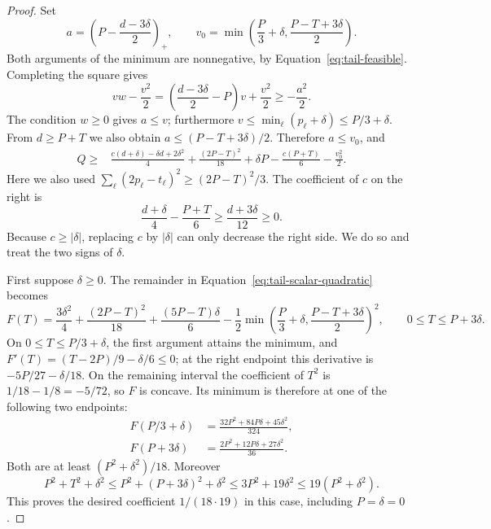\begin{proof}
Set
\[
 a=\left(P-\frac{d-3\delta}{2}\right)_+,
 \qquad v_0=\min\left(\frac P3+\delta,
                         \frac{P-T+3\delta}{2}\right).
\]
Both arguments of the minimum are nonnegative, by
Equation~\eqref{eq:tail-feasible}.  Completing the square gives
\[
 vw-\frac{v^2}{2}
 =\left(\frac{d-3\delta}{2}-P\right)v+\frac{v^2}{2}
 \ge-\frac{a^2}{2}.
\]
The condition $w\ge0$ gives $a\le v$; furthermore
$v\le\min_\ell(p_\ell+\delta)\le P/3+\delta$.  From $d\ge P+T$ we
also obtain $a\le(P-T+3\delta)/2$.  Therefore $a\le v_0$, and
\begin{equation}\label{eq:tail-scalar-quadratic}
 \begin{split}
 Q\ge{}&\frac{c(d+\delta)-\delta d+2\delta^2}{4}
 +\frac{(2P-T)^2}{18}+\delta P
 -\frac{c(P+T)}6-\frac{v_0^2}{2}.
 \end{split}
\end{equation}
Here we also used $\sum_\ell(2p_\ell-t_\ell)^2\ge(2P-T)^2/3$.
The coefficient of $c$ on the right is
\[
 \frac{d+\delta}{4}-\frac{P+T}{6}
 \ge\frac{d+3\delta}{12}\ge0.
\]
Because \(c\ge|\delta|\), replacing \(c\) by \(|\delta|\) can only
decrease the right side. We do so and treat the two signs of \(\delta\).

First suppose $\delta\ge0$.  The remainder in
Equation~\eqref{eq:tail-scalar-quadratic} becomes
\[
 F(T)=\frac{3\delta^2}{4}+\frac{(2P-T)^2}{18}
            +\frac{(5P-T)\delta}{6}-\frac12
            \min\left(\frac P3+\delta,
                        \frac{P-T+3\delta}{2}\right)^2,
 \qquad 0\le T\le P+3\delta.
\]
On $0\le T\le P/3+\delta$, the first argument attains the minimum,
and $F'(T)=(T-2P)/9-\delta/6\le0$; at the right endpoint this
derivative is $-5P/27-\delta/18$.  On the remaining interval the
coefficient of $T^2$ is $1/18-1/8=-5/72$, so $F$ is concave.  Its
minimum is therefore at one of the following two endpoints:
\begin{align*}
 F(P/3+\delta)&=\frac{32P^2+84P\delta+45\delta^2}{324},\\
 F(P+3\delta)&=\frac{2P^2+12P\delta+27\delta^2}{36}.
\end{align*}
Both are at least $(P^2+\delta^2)/18$.  Moreover
\[
 P^2+T^2+\delta^2
 \le P^2+(P+3\delta)^2+\delta^2
 \le3P^2+19\delta^2\le19(P^2+\delta^2).
\]
This proves the desired coefficient $1/(18\cdot19)$ in this case,
including $P=\delta=0$.


\end{proof}

